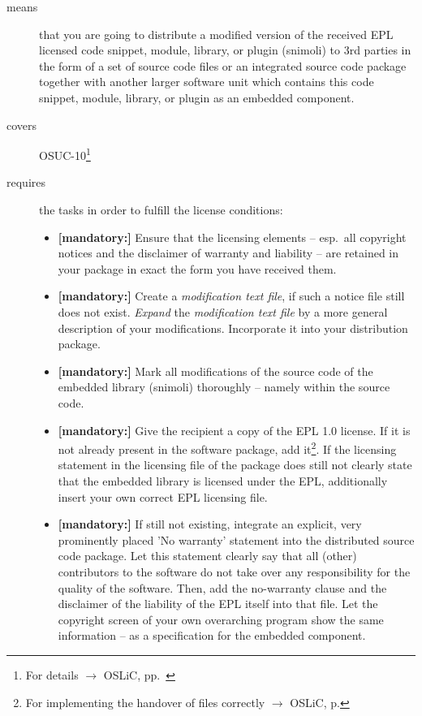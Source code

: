 \begin{description}
\item[means] that you are going to distribute a modified version of the received
EPL licensed code snippet, module, library, or plugin (snimoli) to 3rd
parties in the form of a set of source code files or an integrated source code
package together with another larger software unit which contains this code
snippet, module, library, or plugin as an embedded component.
\item[covers] OSUC-10\footnote{For details $\rightarrow$ OSLiC, pp.\ \pageref{OSUC-10-DEF}}
\item[requires] the tasks in order to fulfill the license conditions:
\begin{itemize}

  \item \textbf{[mandatory:]} Ensure that the licensing elements -- esp.\ all
  copyright notices and the disclaimer of warranty and liability -- are retained
  in your package in exact the form you have received them.

  \item \textbf{[mandatory:]} Create a \emph{modification text file}, if such a
  notice file still does not exist. \emph{Expand} the \emph{modification text
  file} by a more general description of your modifications. Incorporate it into
  your distribution package.
  
  \item \textbf{[mandatory:]} Mark all modifications of the source code of the
  embedded library (snimoli) thoroughly -- namely within the source code.
   
  \item \textbf{[mandatory:]} Give the recipient a copy of the EPL 1.0 license.
  If it is not already present in the software package, add it\footnote{For
  implementing the handover of files correctly $\rightarrow$ OSLiC, p.
  \pageref{DistributingFilesHint}}. If the licensing statement in the licensing
  file of the package does still not clearly state that the embedded library is
  licensed under the EPL, additionally insert your own correct EPL licensing file.

  \item \textbf{[mandatory:]} If still not existing, integrate an explicit, very
  prominently placed 'No warranty' statement into the distributed source code
  package. Let this statement clearly say that all (other) contributors to the
  software do not take over any responsibility for the quality of the software.
  Then, add the no-warranty clause and the disclaimer of the liability of the
  EPL itself into that file. Let the copyright screen of your own overarching
  program show the same information -- as a specification for the embedded
  component.
     

\end{itemize}
\end{description}
